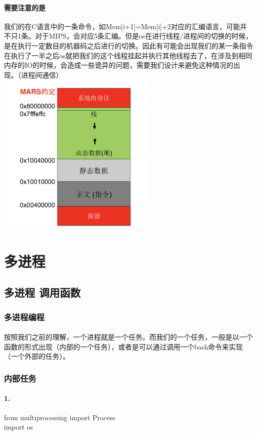 \documentclass[12pt]{article}
\begin{document}
\begin{CJK}{UTF8}{gbsn}
\paragraph{需要注意的是} 我们的在C语言中的一条命令，如Mem[i+1]=Mem[i]+2对应的汇编语言，可能并不只1条。对于MIPS，会对应5条汇编。但是os在进行线程/进程间的切换的时候，是在执行一定数目的机器码之后进行的切换。因此有可能会出现我们的某一条指令在执行了一半之后os就把我们的这个线程挂起并执行其他线程去了，在涉及到相同内存的IO的时候，会造成一些诡异的问题，需要我们设计来避免这种情况的出现。（进程间通信）\\
\includegraphics[width=3in]{CPU.png}

\section{多进程}
\subsection{多进程 调用函数}
\subsubsection{多进程编程}
\paragraph{}按照我们之前的理解，一个进程就是一个任务。而我们的一个任务，一般是以一个函数的形式出现（内部的一个任务），或者是可以通过调用一个bash命令来实现（一个外部的任务）。
\subsubsection{内部任务}
\paragraph{1.}from multiprocessing import Process
\\ import os

\end{CJK}
\end{document}
